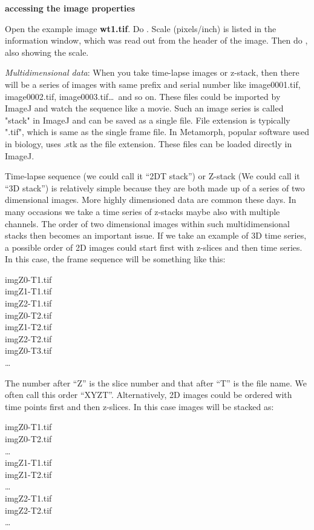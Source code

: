 \begin{indentexercise}{1}

\textbf{accessing the image properties}

Open the example image \textbf{wt1.tif}. Do
. Scale (pixels/inch)
is listed in the information window, which was read out from the header
of the image. Then do ,
also showing the scale. 
\end{indentexercise}

\textit{Multidimensional data}: When you take time-lapse images or z-stack, then
there will be a series of images with same prefix and serial number like
image0001.tif, image0002.tif, image0003.tif\dots\ and so on. These files could
be imported by ImageJ and watch the sequence like a movie. Such an image series
is called "stack" in ImageJ and can be saved as a single file. File extension is
typically ".tif", which is same as the single frame file. In Metamorph, popular
software used in biology, uses .stk as the file extension. These files can be
loaded directly in ImageJ. 

Time-lapse sequence (we could call it ``2DT stack'') or Z-stack (We could call it ``3D stack'') is relatively simple because they are both made up of a series of two dimensional images. More highly dimensioned data are common these days. In many occasions we take a time series of z-stacks maybe also with multiple channels. The order of two dimensional images within such multidimensional stacks then becomes an important issue. If we take an example of 3D time series, a possible order of 2D images could start first with z-slices and then time series. In this case, the frame sequence will be something like this:

imgZ0-T1.tif\\
imgZ1-T1.tif\\
imgZ2-T1.tif\\
imgZ0-T2.tif\\
imgZ1-T2.tif\\
imgZ2-T2.tif\\
imgZ0-T3.tif\\
\ldots

The number after ``Z'' is the slice number and that after ``T'' is the file name. We often call this order ``XYZT''. Alternatively, 2D images could be ordered with time points first and then z-slices. In this case images will be stacked as:

imgZ0-T1.tif\\
imgZ0-T2.tif\\
\ldots\\
imgZ1-T1.tif\\
imgZ1-T2.tif\\
\ldots\\
imgZ2-T1.tif\\
imgZ2-T2.tif\\
\ldots

